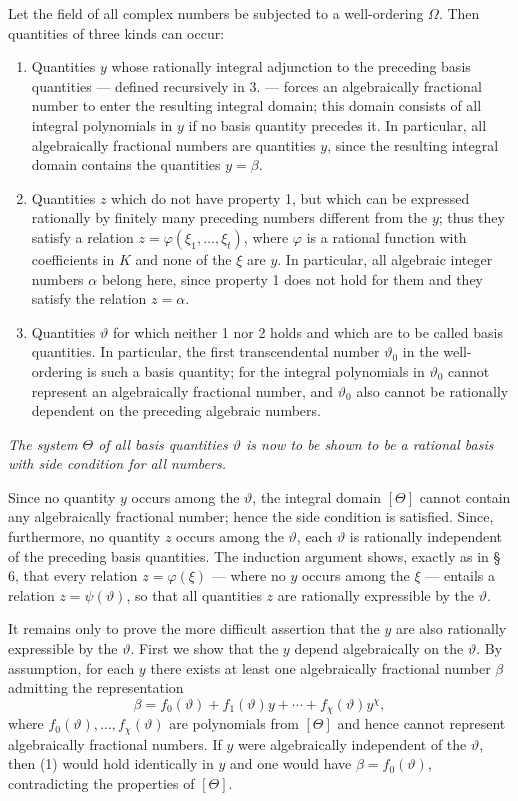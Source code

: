 \documentclass[11pt]{article}
\begin{document}
Let the field of all complex numbers be subjected to a well-ordering $\Omega$.
Then quantities of three kinds can occur:
\begin{enumerate}
\item[1.] Quantities $y$ whose rationally integral adjunction to the preceding
basis quantities --- defined recursively in 3. --- forces an algebraically
fractional number to enter the resulting integral domain; this domain consists
of all integral polynomials in $y$ if no basis quantity precedes it. In
particular, all algebraically fractional numbers are quantities $y$, since the
resulting integral domain contains the quantities $y=\beta$.
\item[2.] Quantities $z$ which do not have property 1, but which can be expressed
rationally by finitely many preceding numbers different from the $y$; thus they
satisfy a relation $z=\varphi(\xi_1,\ldots,\xi_t)$, where $\varphi$ is a
rational function with coefficients in $K$ and none of the $\xi$ are $y$. In
particular, all algebraic integer numbers $\alpha$ belong here, since property 1
does not hold for them and they satisfy the relation $z=\alpha$.
\item[3.] Quantities $\vartheta$ for which neither 1 nor 2 holds and which are to
be called basis quantities. In particular, the first transcendental number
$\vartheta_0$ in the well-ordering is such a basis quantity; for the integral
polynomials in $\vartheta_0$ cannot represent an algebraically fractional number,
and $\vartheta_0$ also cannot be rationally dependent on the preceding algebraic
numbers.
\end{enumerate}

\emph{The system $\Theta$ of all basis quantities $\vartheta$ is now to be shown
to be a rational basis with side condition for all numbers.}

Since no quantity $y$ occurs among the $\vartheta$, the integral domain
$[\Theta]$ cannot contain any algebraically fractional number; hence the side
condition is satisfied. Since, furthermore, no quantity $z$ occurs among the
$\vartheta$, each $\vartheta$ is rationally independent of the preceding basis
quantities. The induction argument shows, exactly as in § 6, that every relation
$z=\varphi(\xi)$ --- where no $y$ occurs among the $\xi$ --- entails a relation
$z=\psi(\vartheta)$, so that all quantities $z$ are rationally expressible by the
$\vartheta$.

It remains only to prove the more difficult assertion that the $y$ are also
rationally expressible by the $\vartheta$. First we show that the $y$ depend
algebraically on the $\vartheta$. By assumption, for each $y$ there exists at
least one algebraically fractional number $\beta$ admitting the representation
\begin{equation}
\beta=f_0(\vartheta)+f_1(\vartheta)y+\cdots+f_\chi(\vartheta)y^\chi,
\tag{1}
\end{equation}
where $f_0(\vartheta),\ldots,f_\chi(\vartheta)$ are polynomials from $[\Theta]$
and hence cannot represent algebraically fractional numbers. If $y$ were
algebraically independent of the $\vartheta$, then (1) would hold identically in
$y$ and one would have $\beta=f_0(\vartheta)$, contradicting the properties of
$[\Theta]$.
\end{document}
